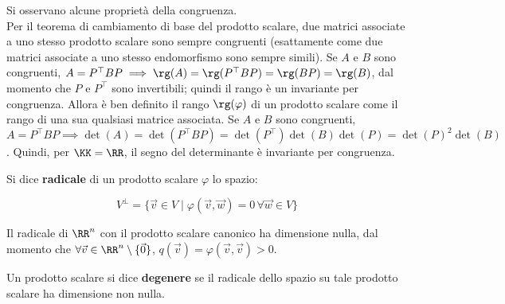 \documentclass[11pt]{article}
\begin{document}
	\begin{remark}
		Si osservano alcune proprietà della congruenza. \\
		
		\li Per il teorema di cambiamento di base del prodotto scalare, due matrici associate a uno stesso
		prodotto scalare sono sempre congruenti (esattamente come due matrici associate a uno stesso
		endomorfismo sono sempre simili).
		\li Se $A$ e $B$ sono congruenti, $A = P^\top B P \implies \rg(A) = \rg(P^\top B P) = \rg(BP) = \rg(B)$,
		dal momento che $P$ e $P^\top$ sono invertibili; quindi il rango è un invariante per congruenza. Allora
		è ben definito il rango $\rg(\varphi)$ di un prodotto scalare come il rango di una sua qualsiasi matrice
		associata.
		\li Se $A$ e $B$ sono congruenti, $A = P^\top B P \implies \det(A) = \det(P^\top B P) = \det(P^\top) \det(B) \det(P)=
		\det(P)^2 \det(B)$. Quindi, per $\KK = \RR$, il segno del determinante è invariante per congruenza.
	\end{remark}

	\begin{definition}
		Si dice \textbf{radicale} di un prodotto scalare $\varphi$ lo spazio:
		
		\[ V^\perp = \{ \vec{v} \in V \mid \varphi(\vec{v}, \vec{w}) = 0 \, \forall \vec{w} \in V \} \]
		
		\vskip 0.05in
	\end{definition}
	
	\begin{remark}
		Il radicale di $\RR^n$ con il prodotto scalare canonico ha dimensione nulla, dal momento che $\forall \vec{v} \in \RR^n \setminus \{\vec{0}\}$, $q(\vec{v}) = \varphi(\vec{v}, \vec{v}) > 0$.
	\end{remark}

	\begin{definition}
		Un prodotto scalare si dice \textbf{degenere} se il radicale dello spazio su tale prodotto scalare ha
		dimensione non nulla.
	\end{definition}
	
	
\end{document}
